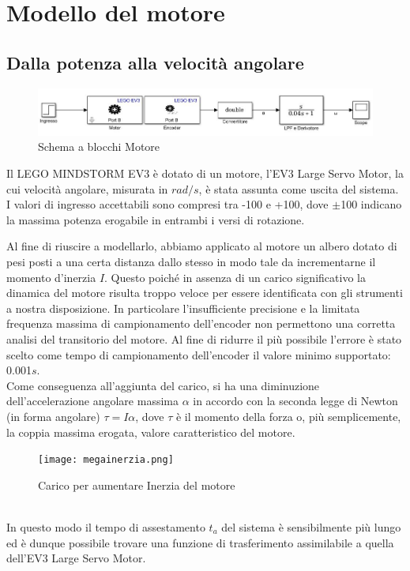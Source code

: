 \chapter{Modello del motore}\label{modMotor}
\section{Dalla potenza alla velocità angolare}
\begin{figure}[ht]
	\centering
	\includegraphics[width=\textwidth]{motoreSimulink.jpg}
	\caption{Schema a blocchi Motore}
	\label{motoreSimulink}
\end{figure}
Il LEGO MINDSTORM EV3 è dotato di un motore, l'EV3 Large Servo Motor, la cui velocità angolare, misurata in $rad/s$, è stata assunta come uscita del sistema.\\
I valori di ingresso accettabili sono compresi tra -100 e +100, dove $\pm$100 indicano la massima potenza erogabile in entrambi i versi di rotazione.

Al fine di riuscire a modellarlo, abbiamo applicato al motore un albero dotato di pesi posti a una certa distanza dallo stesso in modo tale da incrementarne il momento d'inerzia $I$. Questo poiché in assenza di un carico significativo la dinamica del motore risulta  troppo veloce per  essere identificata con gli strumenti a nostra disposizione. In particolare l'insufficiente precisione e la limitata frequenza massima di campionamento dell'encoder non permettono una corretta analisi del transitorio del motore. Al fine di ridurre il più possibile l'errore è stato scelto come tempo di campionamento dell'encoder il valore minimo supportato: 0.001$s$.\\
Come conseguenza all'aggiunta del carico, si ha una diminuzione dell'accelerazione angolare massima $\alpha$ in accordo con la seconda legge di Newton (in forma angolare) $\tau = I\alpha$, dove $\tau$ è il momento della forza o, più semplicemente, la coppia massima erogata, valore caratteristico del motore.
\begin{figure}[ht]
	\centering
	\texttt{[image: megainerzia.png]}
	\caption{Carico per aumentare Inerzia del motore}
	\label{megainerzia}
\end{figure}
\\In questo modo il tempo di assestamento $t_a$ del sistema è sensibilmente più lungo ed è dunque possibile trovare una funzione di trasferimento assimilabile a quella dell'EV3 Large Servo Motor.

